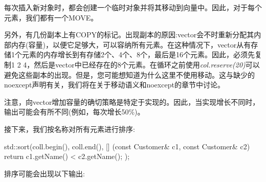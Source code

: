 每次插入新对象时，都会创建一个临时对象并将其移动到向量中。因此，对于每个元素，我们都有一个MOVE。\par

另外，有几份副本上有COPY的标记。出现副本的原因:vector会不时重新分配其内部内存(容量)，以便它足够大，可以容纳所有元素。在这种情况下，vector从有存储1个元素的内存增长到有存储2个、4个、8个，最后是16个元素。因此，必须先复制1 2 4，然后是vector中已经存在的8个元素。在循环之前使用\textit{col.reserve(\allowbreak{}20)\allowbreak{}}可以避免这些副本的出现。但是，您可能想知道为什么这里不使用移动。这与缺少的noexcept声明有关，我们将在关于移动语义和noexcept的章节中讨论。\par

注意，向vector增加容量的确切策略是特定于实现的。因此，当实现增长不同时，输出可能会有所不同(例如，每次增长50\%)。\par


接下来，我们按名称对所有元素进行排序:\par

\begin{codebox}[cpp]
std::sort(coll.begin(), coll.end(),
  [] (const Customer& c1, const Customer& c2) {
    return c1.getName() < c2.getName();
  });
\end{codebox}

排序可能会出现以下输出:\par


